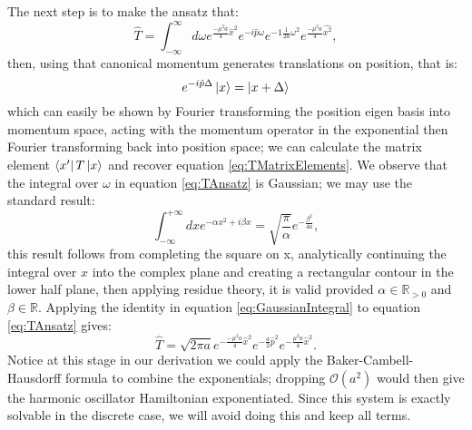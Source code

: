 \documentclass[12pt]{article}
\begin{document}
The next step is to make the ansatz that:
\begin{equation}
	\label{eq:TAnsatz}
	\hat{T} = \int_{-\infty}^{\infty} d\omega e^{\frac{-\mu^2a}{4}\hat{x}^2}e^{-i\hat{p}\omega}e^{-1\frac{1}{2a}\omega^2}e^{\frac{-\mu^2a}{4}\hat{x^2}},
\end{equation}
then, using that canonical momentum generates translations on position, that is:
\begin{equation}
	\label{eq:MomentumTranslation}
	e^{-i\hat{p}\Delta}\ket{x} = \ket{x+\Delta}
\end{equation}
which can easily be shown by Fourier transforming the position eigen basis into momentum space, acting with the momentum operator in the exponential then Fourier transforming back into position space; we can calculate the matrix element $\bra{x'}T\ket{x}$ and recover equation \ref{eq:TMatrixElements}. We observe that the integral over $\omega$ in equation \ref{eq:TAnsatz} is Gaussian; we may use the standard result:
\begin{equation}
	\label{eq:GaussianIntegral}
	\int_{-\infty}^{+\infty}dx e^{-\alpha x^2 + i\beta x} = \sqrt{\frac{\pi}{\alpha}}e^{-\frac{\beta^2}{4a}},
\end{equation}
this result follows from completing the square on x, analytically continuing the integral over $x$ into the complex plane and creating a rectangular contour in the lower half plane, then applying residue theory, it is valid provided $\alpha \in \mathbb{R}_{>0}$ and $\beta \in \mathbb{R}$. Applying the identity in equation \ref{eq:GaussianIntegral} to equation \ref{eq:TAnsatz} gives:
\begin{equation}
	\label{eq:TClosedForm}
	\hat{T} = \sqrt{2\pi a} e^{-\frac{-\mu^2a}{4}\hat{x}^2}e^{-\frac{a}{2}\hat{p}^2}e^{-\frac{\mu^2a}{4}\hat{x}^2}.
\end{equation}
Notice at this stage in our derivation we could apply the Baker-Cambell-Hausdorff formula to combine the exponentials; dropping $\mathcal{O}\left(a^2\right)$ would then give the harmonic oscillator Hamiltonian exponentiated. Since this system is exactly solvable in the discrete case, we will avoid doing this and keep all terms. 
\end{document}
